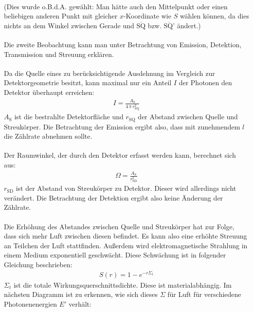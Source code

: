 \documentclass[german,  %
parskip=full,  %
]{scrartcl}
\begin{document}
\\
(Dies wurde o.B.d.A. gewählt: Man hätte auch den Mittelpunkt oder einen beliebigen anderen Punkt mit gleicher $x$-Koordinate wie $S$ wählen können, da dies nichts an dem Winkel zwischen Gerade und $\overline{\text{SQ}}$ bzw. $\overline{\text{SQ'}}$ ändert.)
\\\\
Die zweite Beobachtung kann man unter Betrachtung von Emission, Detektion, Transmission und Streuung erklären.
\\\\
Da die Quelle eines zu berücksichtigende Ausdehnung im Vergleich zur Detektorgeometrie besitzt, kann maximal nur ein Anteil $I$ der Photonen den Detektor überhaupt erreichen:
\begin{align}
I = \frac{A_{\text{S}}}{4 \, \pi \, r_{\text{SQ}}^2}
\end{align}
$A_{\text{S}}$ ist die bestrahlte Detektorfläche und $r_{\text{SQ}}$ der Abstand zwischen Quelle und Streukörper. Die Betrachtung der Emission ergibt also, dass mit zunehmendem $l$ die Zählrate abnehmen sollte.
\\\\
Der Raumwinkel, der durch den Detektor erfasst werden kann, berechnet sich aus:
\begin{align}
\Omega = \frac{A_{\text{S}}}{r_{\text{SD}}^2}
\end{align}
$r_{\text{SD}}$ ist der Abstand von Streukörper zu Detektor. Dieser wird allerdings nicht verändert. Die Betrachtung der Detektion ergibt also keine Änderung der Zählrate.
\\\\
Die Erhöhung des Abstandes zwischen Quelle und Streukörper hat zur Folge, dass sich mehr Luft zwischen diesen befindet. Es kann also eine erhöhte Streuung an Teilchen der Luft stattfinden. Außerdem wird elektromagnetische Strahlung in einem Medium exponentiell geschwächt. Diese Schwächung ist in folgender Gleichung beschrieben:
\begin{align}
S(r) = 1- e^{-r\Sigma_{t}}
\end{align}
$\Sigma_{t}$ ist die totale Wirkungsquerschnittsdichte. Diese ist materialabhängig. Im nächsten Diagramm ist zu erkennen, wie sich dieses $\Sigma$ für Luft für verschiedene Photonenenergien $E'$ verhält:
\newpage
\end{document}
